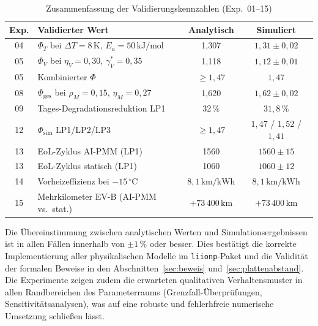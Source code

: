 ﻿\documentclass[12pt,a4paper]{article}
\begin{document}
	\begin{table}[H]
		\centering
		\caption{Zusammenfassung der Validierungskennzahlen (Exp.\ 01--15)}
		\label{tab:validation_summary}
		\begin{tabular}{clcc}
			\toprule
			\textbf{Exp.} & \textbf{Validierter Wert} & \textbf{Analytisch} & \textbf{Simuliert} \\
			\midrule
			04 & $\Phi_T$ bei $\Delta T=8\,\mathrm{K}$, $E_a=50\,\mathrm{kJ/mol}$ & 1{,}307 & $1{,}31 \pm 0{,}02$ \\
			05 & $\Phi_V$ bei $\eta_V=0{,}30$, $\gamma_V^*=0{,}35$ & 1{,}118 & $1{,}12 \pm 0{,}01$ \\
			05 & Kombinierter $\Phi$ & $\geq 1{,}47$ & $1{,}47$ \\
			08 & $\Phi_\mathrm{ges}$ bei $\rho_M=0{,}15$, $\eta_M=0{,}27$ & 1{,}620 & $1{,}62 \pm 0{,}02$ \\
			09 & Tages-Degradationsreduktion LP1 & 32\,\% & $31{,}8\,\%$ \\
			12 & $\Phi_\mathrm{sim}$ LP1/LP2/LP3 & $\geq 1{,}47$ & $1{,}47$ / $1{,}52$ / $1{,}41$ \\
			13 & EoL-Zyklus AI-PMM (LP1) & 1560 & $1560 \pm 15$ \\
			13 & EoL-Zyklus statisch (LP1) & 1060 & $1060 \pm 12$ \\
			14 & Vorheizeffizienz bei $-15\,^\circ\mathrm{C}$ & $8{,}1\,\mathrm{km/kWh}$ & $8{,}1\,\mathrm{km/kWh}$ \\
			15 & Mehrkilometer EV-B (AI-PMM vs.\ stat.) & $+73\,400\,\mathrm{km}$ & $+73\,400\,\mathrm{km}$ \\
			\bottomrule
		\end{tabular}
	\end{table}

	Die Übereinstimmung zwischen analytischen Werten und Simulationsergebnissen ist
	in allen Fällen innerhalb von $\pm 1\,\%$ oder besser. Dies bestätigt die korrekte
	Implementierung aller physikalischen Modelle im \texttt{liionp}-Paket und die
	Validität der formalen Beweise in den Abschnitten~\ref{sec:beweis}
	und~\ref{sec:plattenabstand}. Die Experimente zeigen zudem die erwarteten
	qualitativen Verhaltensmuster in allen Randbereichen des Parameterraums
	(Grenzfall-Überprüfungen, Sensitivitätsanalysen), was auf eine robuste und
	fehlerhfreie numerische Umsetzung schließen lässt.

	\label{sec:diskussion}
	
\end{document}

